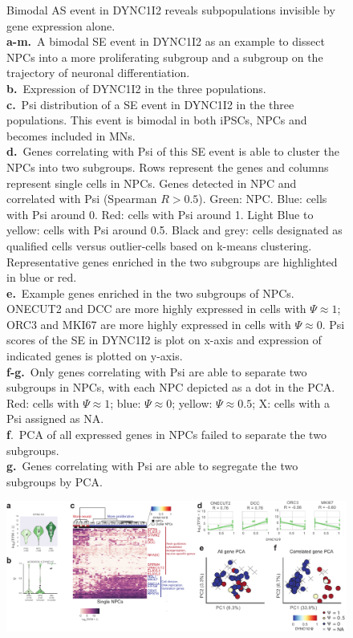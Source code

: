 \clearpage
\thispagestyle{facingcaption}
\begin{figure}[h]
\captionsetup{labelformat=prev-page}
\caption[Bimodal AS event in DYNC1I2 reveals subpopulations invisible by gene expression alone.]{Bimodal AS event in DYNC1I2 reveals subpopulations invisible by gene expression alone.\\
\textbf{a-m.}~A bimodal SE event in DYNC1I2 as an example to dissect NPCs into a more proliferating subgroup and a subgroup on the trajectory of neuronal differentiation.\\
\textbf{b.}~Expression of DYNC1I2 in the three populations.\\
\textbf{c.}~Psi distribution of a SE event in DYNC1I2 in the three populations. This event is bimodal in both iPSCs, NPCs and becomes included in MNs.\\
\textbf{d.}~Genes correlating with Psi of this SE event is able to cluster the NPCs into two subgroups. Rows represent the genes and columns represent single cells in NPCs. Genes detected in NPC and correlated with Psi (Spearman $R > 0.5$). Green: NPC. Blue: cells with Psi around 0. Red: cells with Psi around 1. Light Blue to yellow: cells with Psi around 0.5. Black and grey: cells designated as qualified cells versus outlier-cells based on k-means clustering. Representative genes enriched in the two subgroups are highlighted in blue or red. \\
\textbf{e.}~Example genes enriched in the two subgroups of NPCs. ONECUT2 and DCC are more highly expressed in cells with $\Psi \approx 1$; ORC3 and MKI67 are more highly expressed in cells with $\Psi \approx 0$. Psi scores of the SE in DYNC1I2 is plot on x-axis and expression of indicated genes is plotted on y-axis.\\
\textbf{f-g.}~Only genes correlating with Psi are able to separate two subgroups in NPCs, with each NPC depicted as a dot in the PCA. Red: cells with $\Psi \approx 1$; blue: $\Psi \approx 0$; yellow: $\Psi \approx 0.5$; X: cells with a Psi assigned as NA. \\
\textbf{f}.~PCA of all expressed genes in NPCs failed to separate the two subgroups.\\
\textbf{g.}~Genes correlating with Psi are able to segregate the two subgroups by PCA.
}
\label{fig:hidden_cell_states_part2}
\end{figure}
\clearpage
\begin{figure}[h]
\ContinuedFloat
\captionsetup{labelformat=empty}
\centering
\includegraphics[width=5.8in]{figures/hidden_cell_states_part2.pdf}
\end{figure}
